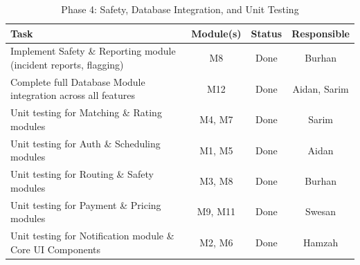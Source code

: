 \begin{table}[h!]
  \centering
  \caption{Phase 4: Safety, Database Integration, and Unit Testing}
  \begin{tabularx}{\textwidth}{|X|c|c|c|}
  \hline
  \textbf{Task} & \textbf{Module(s)} & \textbf{Status} & \textbf{Responsible} \\
  \hline

  Implement Safety \& Reporting module (incident reports, flagging) 
  & M8 & Done & Burhan \\
  \hline

  Complete full Database Module integration across all features 
  & M12 & Done & Aidan, Sarim \\
  \hline

  Unit testing for Matching \& Rating modules
  & M4, M7 & Done & Sarim \\
  \hline
  
  Unit testing for Auth \& Scheduling modules
  & M1, M5 & Done & Aidan \\
  \hline

  Unit testing for Routing \& Safety modules
  & M3, M8 & Done & Burhan \\
  \hline

  Unit testing for Payment \& Pricing modules
  & M9, M11 & Done & Swesan \\
  \hline

  Unit testing for Notification module \& Core UI Components
  & M2, M6 & Done & Hamzah \\
  \hline

  \end{tabularx}
\end{table}


